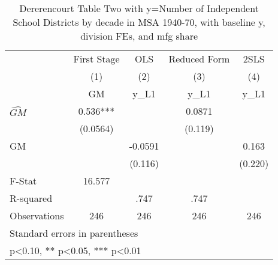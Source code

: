 \begin{table}[htbp]\centering
\def\sym#1{\ifmmode^{#1}\else\(^{#1}\)\fi}
\caption{Dererencourt Table Two with y=Number of Independent School Districts by decade in MSA 1940-70, with baseline y, division FEs, and mfg share}
\begin{tabular}{l*{4}{c}}
\toprule
                    & First Stage   &         OLS   &Reduced Form   &        2SLS   \\
                    &\multicolumn{1}{c}{(1)}&\multicolumn{1}{c}{(2)}&\multicolumn{1}{c}{(3)}&\multicolumn{1}{c}{(4)}\\
                    &\multicolumn{1}{c}{GM}&\multicolumn{1}{c}{y\_L1}&\multicolumn{1}{c}{y\_L1}&\multicolumn{1}{c}{y\_L1}\\
\midrule
$\hat{GM}$          &       0.536***&               &      0.0871   &               \\
                    &    (0.0564)   &               &     (0.119)   &               \\
\addlinespace
GM                  &               &     -0.0591   &               &       0.163   \\
                    &               &     (0.116)   &               &     (0.220)   \\
\midrule
F-Stat              &      16.577   &               &               &               \\
R-squared           &               &        .747   &        .747   &               \\
Observations        &         246   &         246   &         246   &         246   \\
\bottomrule
\multicolumn{5}{l}{\footnotesize Standard errors in parentheses}\\
\multicolumn{5}{l}{\footnotesize * p<0.10, ** p<0.05, *** p<0.01}\\
\end{tabular}
\end{table}
